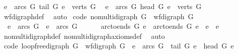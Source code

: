 \begin{isabellebody}
\ {\isacharparenleft}{\kern0pt}{\isasymforall}e\ {\isasymin}\ arcs\ G{\isachardot}{\kern0pt}\ tail\ G\ e\ {\isasymin}\ verts\ G{\isacharparenright}{\kern0pt}\ {\isasymand}\isanewline
\ {\isacharparenleft}{\kern0pt}{\isasymforall}e\ {\isasymin}\ arcs\ G{\isachardot}{\kern0pt}\ head\ G\ e\ {\isasymin}\ verts\ G{\isacharparenright}{\kern0pt}{\isacharparenright}{\kern0pt}{\isachardoublequoteclose}\isanewline
%
\isadelimproof
\ \ %
\endisadelimproof
%
\isatagproof
{}\isamarkupfalse%
\ wf{\isacharunderscore}{\kern0pt}digraph{\isacharunderscore}{\kern0pt}def\ \isamarkupfalse%
\ auto%
\endisatagproof
{\isafoldproof}%
%
\isadelimproof
\isanewline
%
\endisadelimproof
\isanewline
{}\isamarkupfalse%
\ {\isacharbrackleft}{\kern0pt}code{\isacharbrackright}{\kern0pt}{\isacharcolon}{\kern0pt}\ {\isachardoublequoteopen}nomulti{\isacharunderscore}{\kern0pt}digraph\ G\ {\isacharequal}{\kern0pt}\ {\isacharparenleft}{\kern0pt}wf{\isacharunderscore}{\kern0pt}digraph\ G\ {\isasymand}\ \isanewline
\ \ {\isacharparenleft}{\kern0pt}{\isasymforall}e{}\ {\isasymin}\ arcs\ G{\isachardot}{\kern0pt}\ {\isasymforall}\ e{}\ {\isasymin}\ arcs\ G\ {\isachardot}{\kern0pt}\isanewline
\ \ \ \ \ arc{\isacharunderscore}{\kern0pt}to{\isacharunderscore}{\kern0pt}ends\ G\ e{}\ {\isacharequal}{\kern0pt}\ arc{\isacharunderscore}{\kern0pt}to{\isacharunderscore}{\kern0pt}ends\ G\ e{}\ {\isasymlongrightarrow}\ e{}\ {\isacharequal}{\kern0pt}\ e{}{\isacharparenright}{\kern0pt}{\isacharparenright}{\kern0pt}{\isachardoublequoteclose}\isanewline
%
\isadelimproof
\ \ %
\endisadelimproof
%
\isatagproof
{}\isamarkupfalse%
\ nomulti{\isacharunderscore}{\kern0pt}digraph{\isacharunderscore}{\kern0pt}def\ nomulti{\isacharunderscore}{\kern0pt}digraph{\isacharunderscore}{\kern0pt}axioms{\isacharunderscore}{\kern0pt}def\ \isamarkupfalse%
\ auto%
\endisatagproof
{\isafoldproof}%
%
\isadelimproof
\isanewline
%
\endisadelimproof
\isanewline
{}\isamarkupfalse%
\ {\isacharbrackleft}{\kern0pt}code{\isacharbrackright}{\kern0pt}{\isacharcolon}{\kern0pt}\ {\isachardoublequoteopen}loopfree{\isacharunderscore}{\kern0pt}digraph\ G\ {\isacharequal}{\kern0pt}\ {\isacharparenleft}{\kern0pt}wf{\isacharunderscore}{\kern0pt}digraph\ G\ {\isasymand}\ {\isacharparenleft}{\kern0pt}{\isasymforall}e\ {\isasymin}\ arcs\ G{\isachardot}{\kern0pt}\ \ tail\ G\ e\ {\isasymnoteq}\ head\ G\ e{\isacharparenright}{\kern0pt}{\isacharparenright}{\kern0pt}{\isachardoublequoteclose}\isanewline

\end{isabellebody}

